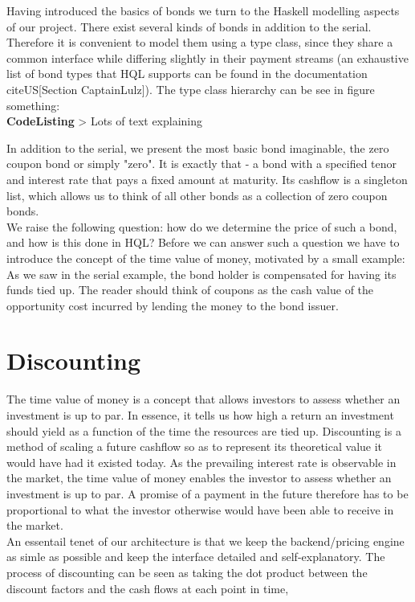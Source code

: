 Having introduced the basics of bonds we turn to the Haskell modelling aspects 
of our project. There exist several kinds of bonds in addition to the serial. 
Therefore it is convenient to model them using a type class, since they share a 
common interface while differing slightly in their payment streams (an 
exhaustive list of bond types that HQL supports can be found in the 
documentation cite{US}[Section CaptainLulz]). The type class hierarchy can be 
see in figure something:\\

\textbf{CodeListing}
> Lots of text explaining


In addition to the serial, we present the most basic bond imaginable, the zero 
coupon bond or simply "zero". It is exactly that - a bond with a specified 
tenor and interest rate that pays a fixed amount at maturity. Its cashflow is a 
singleton list, which allows us to think of all other bonds as a collection of 
zero coupon bonds.\\

We raise the following question: how do we determine the price of such a bond, 
and how is this done in HQL? Before we can answer such a question we have to 
introduce the concept of the time value of money, motivated by a small example: 
As we saw in the serial example, the bond holder is compensated for having its 
funds tied up. The reader should think of coupons as the cash value of the 
opportunity cost incurred by lending the money to the bond issuer.

\section{Discounting}

The time value of money is a concept that allows investors to assess whether an 
investment is up to par. In essence, it tells us how high a return an 
investment should yield as a function of the time the resources are tied up. 
Discounting is a method of scaling a future cashflow so as to represent its 
theoretical value it would have had it existed today. As the prevailing 
interest rate is observable in the market, the time value of money enables the 
investor to assess whether an investment is up to par. A promise of a payment 
in the future therefore has to be proportional to what the investor otherwise 
would have been able to receive in the market.\\

An essentail tenet of our architecture is that we keep the backend/pricing 
engine as simle as possible and keep the interface detailed and 
self-explanatory. The process of discounting can be seen as taking the dot product
between the discount factors and the cash flows at each point in time,

